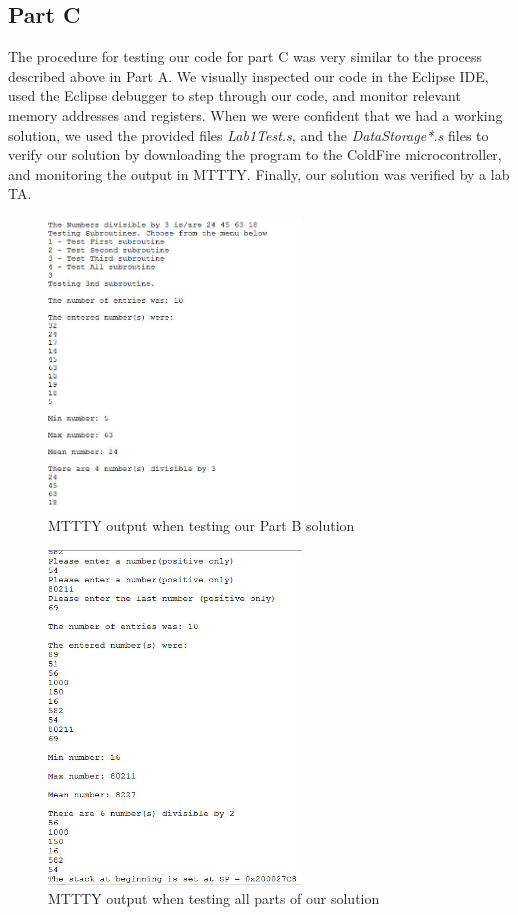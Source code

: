 \documentclass[letterpaper]{article}
\begin{document}
    \subsection{Part C}
      The procedure for testing our code for part C was very similar to the process
      described above in Part A. We visually inspected our code in the Eclipse IDE,
      used the Eclipse debugger to step through our code, and monitor relevant
      memory addresses and registers. When we were confident that we had a working
      solution, we used the provided files \textit{Lab1Test.s}, and the \textit{DataStorage*.s}
      files to verify our solution by downloading the program to the ColdFire microcontroller,
      and monitoring the output in MTTTY. Finally, our solution was verified by a lab TA.

      \begin{figure}[H]
        \centering
        \includegraphics[width=0.6\textwidth]{partc.jpg}
        \caption{MTTTY output when testing our Part B solution}
      \end{figure}

      \begin{figure}[H]
        \centering
        \includegraphics[width=0.6\textwidth]{allparts.jpg}
        \caption{MTTTY output when testing all parts of our solution}
      \end{figure}
\end{document}
